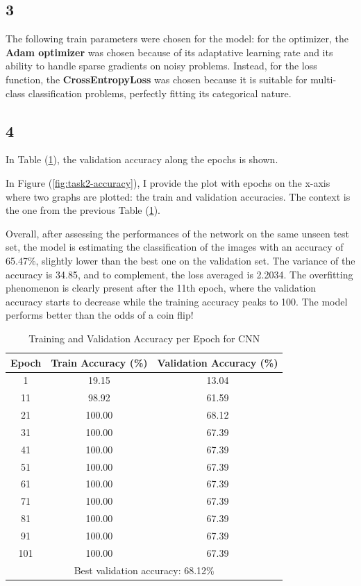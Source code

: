 \documentclass[11pt]{scrartcl}
\begin{document}
\subsection*{3}

The following train parameters were chosen for the model:
for the optimizer, the \textbf{Adam optimizer} was chosen 
because of its adaptative learning rate
and its ability to handle sparse gradients on noisy problems.
Instead, for the loss function, the \textbf{CrossEntropyLoss} was chosen 
because it is suitable for multi-class classification problems,
perfectly fitting its categorical nature.


\subsection*{4}

In Table (\ref{tab:task2-accuracy}),
the validation accuracy along the epochs is shown.

In Figure (\ref{fig:task2-accuracy}), 
I provide the plot with epochs on the x-axis where two graphs are plotted:
the train and validation accuracies.
The context is the one from the previous Table (\ref{tab:task2-accuracy}). 

Overall, after assessing the performances of the network on the same unseen test set,
the model is estimating the classification of the images with an accuracy of 65.47\%, 
slightly lower than the best one on the validation set.
The variance of the accuracy is 34.85, and to complement, the loss averaged is 2.2034.
The overfitting phenomenon is clearly present after the 11th epoch,
where the validation accuracy starts to decrease while the training accuracy peaks to 100.
The model performs better than the odds of a coin flip!

\begin{table}[htbp]
\centering
\caption{Training and Validation Accuracy per Epoch for CNN}
\begin{tabular}{ccc}
\toprule
\textbf{Epoch} & \textbf{Train Accuracy (\%)} & \textbf{Validation Accuracy (\%)} \\
\midrule
1    & 19.15  & 13.04  \\
11   & 98.92  & 61.59  \\
21   & 100.00 & 68.12  \\
31   & 100.00 & 67.39  \\
41   & 100.00 & 67.39  \\
51   & 100.00 & 67.39  \\
61   & 100.00 & 67.39  \\
71   & 100.00 & 67.39  \\
81   & 100.00 & 67.39  \\
91   & 100.00 & 67.39  \\
101  & 100.00 & 67.39  \\
\midrule
\multicolumn{3}{c}{Best validation accuracy: 68.12\%} \\
\bottomrule
\end{tabular}
\label{tab:task2-accuracy}
\end{table}
\end{document}
